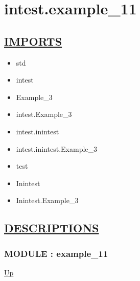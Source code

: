 \chapter*{intest.example\_11}
\hypertarget{ecldoc:toc:intest.example_11}{}

\section*{\underline{IMPORTS}}
\begin{itemize}
\item std
\item intest
\item Example\_3
\item intest.Example\_3
\item intest.inintest
\item intest.inintest.Example\_3
\item test
\item Inintest
\item Inintest.Example\_3
\end{itemize}

\section*{\underline{DESCRIPTIONS}}
\subsection*{MODULE : example\_11}
\hypertarget{ecldoc:intest.example_11}{}
\par
\begin{minipage}[t]{\textwidth}
\begin{flushleft}
  
\end{flushleft}
\end{minipage}
\hyperlink{ecldoc:toc:intest}{Up} \\
\par
\par
